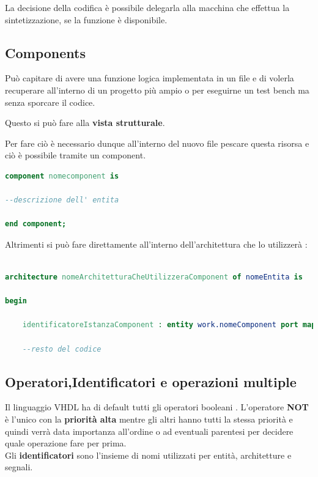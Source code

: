 \documentclass[a4paper]{book}
\begin{document}
La decisione della codifica è possibile delegarla alla macchina che effettua la sintetizzazione, se la funzione è disponibile.


\subsection{Components}

Può capitare di avere una funzione logica implementata in un file e di volerla recuperare all'interno di un progetto più ampio o per eseguirne un test bench ma senza sporcare il codice.

Questo si può fare alla  \textbf{vista strutturale}.

Per fare ciò è necessario dunque all'interno del nuovo file pescare questa risorsa e ciò è possibile tramite un component.


\begin{lstlisting}[language=VHDL]
component nomecomponent is 

--descrizione dell' entita

end component;
\end{lstlisting}

Altrimenti si può fare direttamente all'interno dell'architettura che lo utilizzerà :

\begin{lstlisting}[language=VHDL]

architecture nomeArchitetturaCheUtilizzeraComponent of nomeEntita is

begin

	identificatoreIstanzaComponent : entity work.nomeComponent port map ();
	
	--resto del codice


\end{lstlisting}

\subsection{Operatori,Identificatori e operazioni multiple}

Il linguaggio VHDL ha di default tutti gli operatori booleani .
L'operatore \textbf{NOT} è l'unico con la \textbf{priorità alta} mentre gli altri hanno tutti la stessa priorità e quindi verrà data importanza all'ordine o ad eventuali parentesi per decidere quale operazione fare per prima.\\

Gli \textbf{identificatori} sono l'insieme di nomi utilizzati per entità, architetture e segnali.\\
\end{document}
